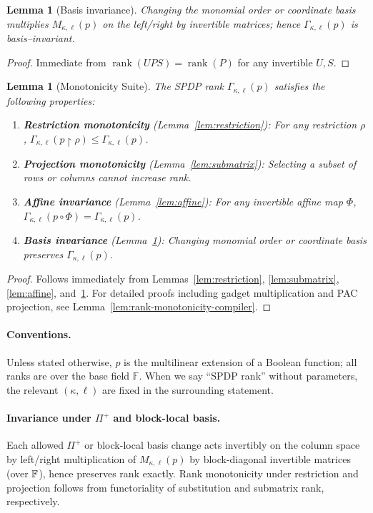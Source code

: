 \documentclass[12pt]{article}
\DeclareMathOperator{\rank}{rank}
\newtheorem{lemma}[theorem]{Lemma}
\theoremstyle{definition}
\theoremstyle{definition}
\theoremstyle{remark}
\theoremstyle{remark}
\begin{document}
\begin{lemma}[Basis invariance]
\label{lem:basis-invariance}
Changing the monomial order or coordinate basis multiplies $M_{\kappa,\ell}(p)$ on the left/right by invertible matrices; hence $\Gamma_{\kappa,\ell}(p)$ is basis--invariant.
\end{lemma}
\begin{proof}
Immediate from $\rank(UPS)=\rank(P)$ for any invertible $U,S$.
\end{proof}

\begin{lemma}[Monotonicity Suite]
\label{lem:monotonicity-suite}
The SPDP rank $\Gamma_{\kappa,\ell}(p)$ satisfies the following properties:
\begin{enumerate}[label=(\alph*)]
\item \textbf{Restriction monotonicity} (Lemma~\ref{lem:restriction}): For any restriction $\rho$, $\Gamma_{\kappa,\ell}(p\!\upharpoonright\!\rho) \leq \Gamma_{\kappa,\ell}(p)$.
\item \textbf{Projection monotonicity} (Lemma~\ref{lem:submatrix}): Selecting a subset of rows or columns cannot increase rank.
\item \textbf{Affine invariance} (Lemma~\ref{lem:affine}): For any invertible affine map $\Phi$, $\Gamma_{\kappa,\ell}(p\circ\Phi) = \Gamma_{\kappa,\ell}(p)$.
\item \textbf{Basis invariance} (Lemma~\ref{lem:basis-invariance}): Changing monomial order or coordinate basis preserves $\Gamma_{\kappa,\ell}(p)$.
\end{enumerate}
\end{lemma}
\begin{proof}
Follows immediately from Lemmas~\ref{lem:restriction}, \ref{lem:submatrix}, \ref{lem:affine}, and~\ref{lem:basis-invariance}. For detailed proofs including gadget multiplication and PAC projection, see Lemma~\ref{lem:rank-monotonicity-compiler}.
\end{proof}

\paragraph{Conventions.}
Unless stated otherwise, $p$ is the multilinear extension of a Boolean function; all ranks are
over the base field $\mathbb{F}$. When we say ``SPDP rank'' without parameters, the relevant $(\kappa,\ell)$
are fixed in the surrounding statement.

\paragraph{Invariance under $\Pi^+$ and block-local basis.}
Each allowed $\Pi^+$ or block-local basis change acts invertibly on the column space by left/right multiplication of $M_{\kappa,\ell}(p)$ by block-diagonal invertible matrices (over $\Bbb F$), hence preserves rank exactly. Rank monotonicity under restriction and projection follows from functoriality of substitution and submatrix rank, respectively.
\end{document}
